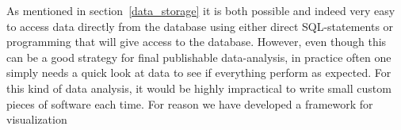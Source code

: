 As mentioned in section~\ref{data_storage} it is both possible and indeed very easy to access data directly from the database using either direct SQL-statements or programming that will give access to the database. However, even though this can be a good strategy for final publishable data-analysis, in practice often one simply needs a quick look at data to see if everything perform as expected. For this kind of data analysis, it would be highly impractical to write small custom pieces of software each time. For reason we have developed a framework for visualization 
